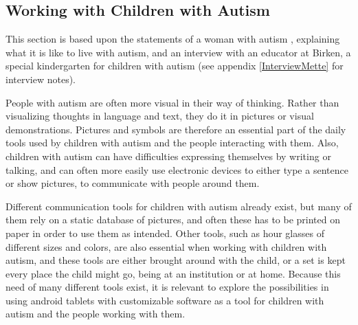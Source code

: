 \subsection{Working with Children with Autism}
This section is based upon the statements of a woman with autism \cite{autism.com}, explaining what it is like to live with autism, and an interview with an educator at Birken, a special kindergarten for children with autism (see appendix \ref{InterviewMette} for interview notes).

	People with autism are often more visual in their way of thinking. Rather than visualizing thoughts in language and text, they do it in pictures or visual demonstrations. Pictures and symbols are therefore an essential part of the daily tools used by children with autism and the people interacting with them. Also, children with autism can have difficulties expressing themselves by writing or talking, and can often more easily use electronic devices to either type a sentence or show pictures, to communicate with people around them.

Different communication tools for children with autism already exist, but many of them rely on a static database of pictures, and often these has to be printed on paper in order to use them as intended. Other tools, such as hour glasses of different sizes and colors, are also essential when working with children with autism, and these tools are either brought around with the child, or a set is kept every place the child might go, being at an institution or at home.
Because this need of many different tools exist, it is relevant to explore the possibilities in using android tablets with customizable software as a tool for children with autism and the people working with them.